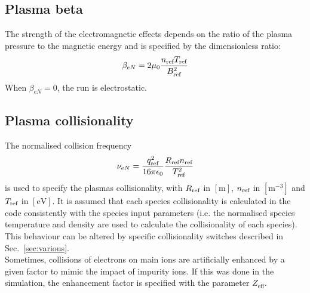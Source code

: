 \documentclass[fleqn]{report}
\begin{document}
\subsection{Plasma beta}
The strength of the electromagnetic effects depends on the ratio of the plasma pressure to the magnetic energy and is specified by the dimensionless ratio:
\begin{equation}
\beta_{eN} = 2\mu_0 \frac{n_{\textrm{ref}} T_{\textrm{ref}}}{B_{\textrm{ref}}^2}
\end{equation}
When $\beta_{eN}=0$, the run is electrostatic. 
 
\subsection{Plasma collisionality}
The normalised collision frequency
\begin{equation}
 \nu_{eN} = \frac{q_{\textrm{ref}}^2}{16\pi\epsilon_0}\frac{R_{\textrm{ref}} n_{\textrm{ref}}}{T_{\textrm{ref}}^2}
\end{equation}
is used to specify the plasmas collisionality, with $R_{\textrm{ref}}$ in $[\textrm{m}]$, $n_{\textrm{ref}}$ in $[\textrm{m}^{-3}]$ and $T_{\textrm{ref}}$ in $[\textrm{eV}]$. It is assumed that each species collisionality is calculated in the code consistently with the species input parameters (i.e. the normalised species temperature and density are used to calculate the collisionality of each species). This behaviour can be altered by specific collisionality switches described in Sec.~\ref{sec:various}.\\
Sometimes, collisions of electrons on main ions are artificially enhanced by a given factor to mimic the impact of impurity ions. If this was done in the simulation, the enhancement factor is specified with the parameter $Z_\textrm{eff}$.
\end{document}
